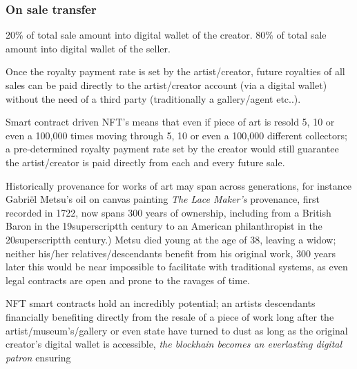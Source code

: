 \subsubsection{On sale transfer}
20\% of total sale amount into digital wallet of the creator.
80\% of total sale amount into digital wallet of the seller.

Once the royalty payment rate is set by the artist/creator, future
royalties of all sales can be paid directly to the artist/creator
account (via a digital wallet) without the need of a third party
(traditionally a gallery/agent etc..).

Smart contract driven NFT's means that even if piece of art is resold 5,
10 or even a 100,000 times moving through 5, 10 or even a 100,000
different collectors; a pre-determined royalty payment rate set by the
creator would still guarantee the artist/creator is paid directly from
each and every future sale.

Historically provenance for works of art may span across generations,
for instance Gabriël Metsu's oil on canvas painting \emph{The Lace
Maker's} provenance, first recorded in 1722, now spans 300 years of
ownership, including from a British Baron in the 19superscript{th}
century to an American philanthropist in the 20superscript{th}
century.) Metsu died young at the age of 38, leaving a widow; neither
his/her relatives/descendants benefit from his original work, 300 years
later this would be near impossible to facilitate with traditional
systems, as even legal contracts are open and prone to the ravages of
time.

NFT smart contracts hold an incredibly potential; an artists descendants
financially benefiting directly from the resale of a piece of work long
after the artist/museum's/gallery or even state have turned to dust as
long as the original creator's digital wallet is accessible, \emph{the
blockhain becomes an everlasting digital patron} ensuring


